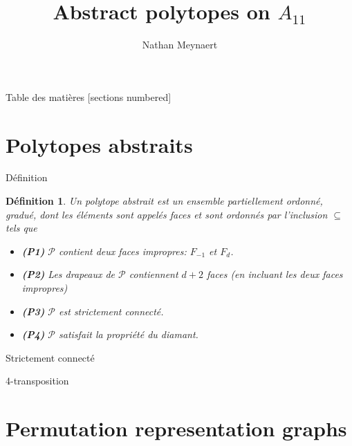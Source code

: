 \documentclass[10pt]{beamer}
\title{Abstract polytopes on $A_{11}$}
\date{}
\author{Nathan Meynaert}
\newtheorem{definition}{Définition}[section]
\begin{document}
\maketitle

\begin{frame}{Table des matières}
  [sections numbered]
  \tableofcontents[hideallsubsections]
\end{frame}

\section{Polytopes abstraits}

\begin{frame}{Définition}

  \begin{definition}
    Un \textit{polytope abstrait} est un ensemble partiellement ordonné, gradué,  dont les éléments sont appelés \textit{faces} et sont ordonnés par l'inclusion $\subseteq$ tels que
    \begin{itemize}
      \item \textbf{(P1)} $\mathcal P$ contient deux faces impropres: $F_{-1}$ et $F_d$.
      \item \textbf{(P2)} Les drapeaux de $\mathcal P$ contiennent $d+2$ faces (en incluant les deux faces impropres)    \item \textbf{(P3)} $\mathcal P$ est strictement connecté.
      \item \textbf{(P4)} $\mathcal P$ satisfait la propriété du diamant.
    \end{itemize}
  \end{definition}

\end{frame}

\begin{frame}{Strictement connecté}
\end{frame}

\begin{frame}{4-transposition}
\end{frame}

\section{Permutation representation graphs}
\end{document}
